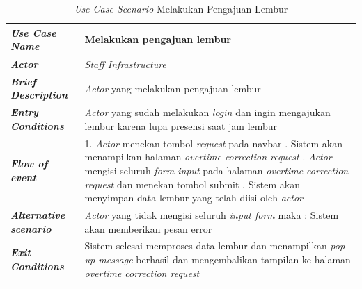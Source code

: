 \FloatBarrier
\begin{longtable}{ |p{6cm}|p{8cm}|}
\caption{\textit{Use Case Scenario} Melakukan Pengajuan Lembur}\label{tab:use-case-scenario-melakukan-pengajuan-lembur} 
\\
\hline
\textbf{\textit{Use Case Name}}
&Melakukan pengajuan lembur
\\ \hline

\textbf{\textit{Actor}}
&\textit{Staff Infrastructure}
\\ \hline

\textbf{\textit{Brief Description}}
&\textit{Actor} yang melakukan pengajuan lembur
\\ \hline

\textbf{\textit{Entry Conditions}}
&\textit{Actor} yang sudah melakukan \textit{login} dan ingin mengajukan lembur karena lupa presensi saat jam lembur
\\ \hline

\textbf{\textit{Flow of event}}
&1. \textit{Actor} menekan tombol \textit{request} pada navbar
\newline
2. Sistem akan menampilkan halaman \textit{overtime correction request}
\newline
3. \textit{Actor} mengisi seluruh \textit{form input} pada halaman \textit{overtime correction request} dan menekan tombol submit
\newline
4. Sistem akan menyimpan data lembur yang telah diisi oleh \textit{actor}
\\ \hline

\textbf{\textit{Alternative scenario}}
&\textit{Actor} yang tidak mengisi seluruh \textit{input form} maka : Sistem akan memberikan pesan error
\\ \hline

\textbf{\textit{Exit Conditions}}
&Sistem selesai memproses data lembur dan menampilkan \textit{pop up message} berhasil dan mengembalikan tampilan ke halaman \textit{overtime correction request}
\\ \hline
\end{longtable}

